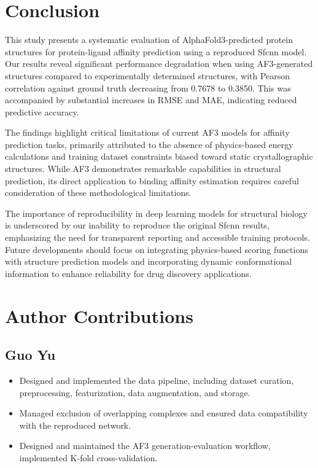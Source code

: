 \documentclass[unnumsec,webpdf,contemporary,large]{oup-authoring-template}
\theoremstyle{thmstyleone}%
\theoremstyle{thmstyletwo}%
\theoremstyle{thmstylethree}%
\begin{document}
\section{Conclusion}
This study presents a systematic evaluation of AlphaFold3-predicted protein structures 
for protein-ligand affinity prediction using a reproduced Sfcnn model. 
Our results reveal significant performance degradation when using AF3-generated structures 
compared to experimentally determined structures, with Pearson correlation against ground truth decreasing from 
0.7678 to 0.3850. 
This was accompanied by substantial increases in RMSE and MAE, indicating reduced predictive accuracy.

The findings highlight critical limitations of current AF3 models for affinity prediction tasks, 
primarily attributed to the absence of physics-based energy calculations and training dataset 
constraints biased toward static crystallographic structures. While AF3 demonstrates remarkable 
capabilities in structural prediction, its direct application to binding affinity estimation 
requires careful consideration of these methodological limitations.

The importance of reproducibility in deep learning models for structural biology is underscored 
by our inability to reproduce the original Sfcnn results, emphasizing the need for transparent 
reporting and accessible training protocols. Future developments should focus on integrating 
physics-based scoring functions with structure prediction models and incorporating dynamic 
conformational information to enhance reliability for drug discovery applications.


\section{Author Contributions}

\subsection{Guo Yu}
\begin{itemize}
    \item Designed and implemented the data pipeline, including dataset curation, preprocessing, featurization, data augmentation, and storage.
    \item Managed exclusion of overlapping complexes and ensured data compatibility with the reproduced network.
    \item Designed and maintained the AF3 generation-evaluation workflow, implemented K-fold cross-validation.
\end{itemize}
\end{document}
